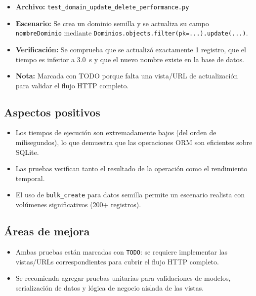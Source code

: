 \documentclass[12pt,a4paper]{article}
\begin{document}
\begin{itemize}
  \item \textbf{Archivo:} \texttt{test\_domain\_update\_delete\_performance.py}
  \item \textbf{Escenario:} Se crea un dominio semilla y se actualiza su campo
        \texttt{nombreDominio} mediante \texttt{Dominios.objects.filter(pk=...).update(...)}.
  \item \textbf{Verificación:} Se comprueba que se actualizó exactamente 1 registro, que el
        tiempo es inferior a 3.0~s y que el nuevo nombre existe en la base de datos.
  \item \textbf{Nota:} Marcada con TODO porque falta una vista/URL de actualización para validar
        el flujo HTTP completo.
\end{itemize}

\subsection{Aspectos positivos}

\begin{itemize}
  \item Los tiempos de ejecución son extremadamente bajos (del orden de milisegundos),
        lo que demuestra que las operaciones ORM son eficientes sobre SQLite.
  \item Las pruebas verifican tanto el resultado de la operación como el rendimiento temporal.
  \item El uso de \texttt{bulk\_create} para datos semilla permite un escenario realista
        con volúmenes significativos (200+ registros).
\end{itemize}

\subsection{Áreas de mejora}

\begin{itemize}
  \item Ambas pruebas están marcadas con \texttt{TODO}: se requiere implementar las
        vistas/URLs correspondientes para cubrir el flujo HTTP completo.
  \item Se recomienda agregar pruebas unitarias para validaciones de modelos, serialización
        de datos y lógica de negocio aislada de las vistas.
\end{itemize}

\newpage
\end{document}
